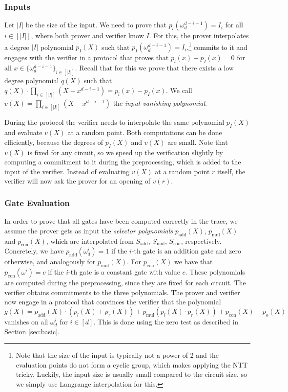 \documentclass[final]{zamarep}
\newcommand{\abs}[1]{\lvert #1 \rvert}
\newcommand{\Sel}[1]{S_{\mathrm{#1}}}
\newcommand{\psel}[1]{p_{\mathrm{#1}}}
\begin{document}
\subsubsection{Inputs}
\label{sec:inputs}

Let $\abs{I}$ be the size of the input. We need to prove that $p_l(\omega_d^{d - i - 1}) = I_i$ for all $i \in [\abs{I}]$, where both prover and verifier know $I$. For this, the prover interpolates a degree $\abs{I}$ polynomial $p_I(X)$ such that $p_I(\omega_d^{d - i - 1}) = I_i$,\footnote{Note that the size of the input is typically not a power of 2 and the evaluation points do not form a cyclic group, which makes applying the NTT tricky. Luckily, the input size is usually small compared to the circuit size, so we simply use Langrange interpolation for this.} commits to it and engages with the verifier in a protocol that proves that $p_l(x) - p_I(x) = 0$ for all $x \in \{\omega_d^{d - i - 1}\}_{i \in [\abs{I}]}$. Recall that for this we prove that there exists a low degree polynomial $q(X)$ such that $q(X) \cdot \prod_{i \in [\abs{I}]} (X - x^{d - i - 1}) = p_l(x) - p_I(x)$. We call $v(X) = \prod_{i \in [\abs{I}]} (X - x^{d - i - 1})$ the \emph{input vanishing polynomial}.

During the protocol the verifier needs to interpolate the same polynomial $p_I(X)$ and evaluate $v(X)$ at a random point. Both computations can be done efficiently, because the degrees of $p_I(X)$ and $v(X)$ are small. Note that $v(X)$ is fixed for any circuit, so we speed up the verification slightly by computing a commitment to it during the preprocessing, which is added to the input of the verifier. Instead of evaluating $v(X)$ at a random point $r$ itself, the verifier will now ask the prover for an opening of $v(r)$.  

\subsubsection{Gate Evaluation}
\label{sec:gates}
In order to prove that all gates have been computed correctly in the trace, we assume the prover gets as input the \emph{selector polynomials} $\psel{add}(X)$, $\psel{mul}(X)$ and $\psel{con}(X)$, which are interpolated from $\Sel{add}$, $\Sel{mul}$, $\Sel{con}$, respectively. Concretely, we have $\psel{add}(\omega_d^i) = 1$ if the $i$-th gate is an addition gate and zero otherwise, and analogously for $\psel{mul}(X)$. For $\psel{con}(X)$ we have that $\psel{con}(\omega^i) = c$ if the $i$-th gate is a constant gate with value $c$. These polynomials are computed during the preprocessing, since they are fixed for each circuit. The verifier obtains commitments to the three polynomials. The prover and verifier now engage in a protocol that convinces the verifier that the polynomial $g(X) = \psel{add}(X) \cdot (p_l(X) + p_r(X)) + \psel{mul}(p_l(X) \cdot p_r(X)) + \psel{con}(X) - p_o(X)$ vanishes on all $\omega_d^i$ for $i \in [d]$. This is done using the zero test as described in Section \ref{sec:basic}.
\end{document}
